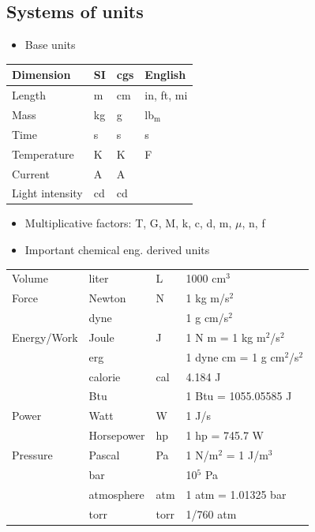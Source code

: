 \documentclass[11pt]{article}
\begin{document}
\subsection{Systems of units}
\label{sec-3-3}
\begin{itemize}
\item Base units
\end{itemize}

\begin{center}
\begin{tabular}{llll}
\hline
Dimension & SI & cgs & English\\
\hline
Length & m & cm & in, ft, mi\\
Mass & kg & g & lb$_{\text{m}}$\\
Time & s & s & s\\
Temperature & K & K & F\\
Current & A & A & \\
Light intensity & cd & cd & \\
\hline
\end{tabular}
\end{center}

\begin{itemize}
\item Multiplicative factors: T, G, M, k, c, d, m, $\mu$, n, f

\item Important chemical eng. derived units
\end{itemize}
\begin{center}
\begin{tabular}{llll}
\hline
Volume & liter & L & 1000 cm$^{\text{3}}$\\
Force & Newton & N & 1 kg m/s$^{\text{2}}$\\
 & dyne &  & 1 g cm/s$^{\text{2}}$\\
Energy/Work & Joule & J & 1 N m = 1 kg m$^{\text{2}}$/s$^{\text{2}}$\\
 & erg &  & 1 dyne cm = 1 g cm$^{\text{2}}$/s$^{\text{2}}$\\
 & calorie & cal & 4.184 J\\
 & Btu &  & 1 Btu = 1055.05585 J\\
Power & Watt & W & 1 J/s\\
 & Horsepower & hp & 1 hp = 745.7 W\\
Pressure & Pascal & Pa & 1 N/m$^{\text{2}}$ = 1 J/m$^{\text{3}}$\\
 & bar &  & 10$^{\text{5}}$ Pa\\
 & atmosphere & atm & 1 atm = 1.01325 bar\\
 & torr & torr & 1/760 atm\\
\hline
\end{tabular}
\end{center}
\end{document}
